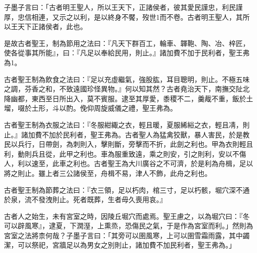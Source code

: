
\begin{pinyinscope}
子墨子言曰：「古者明王聖人，所以王天下，正諸侯者，彼其愛民謹忠，利民謹厚，忠信相連，又示之以利，是以終身不饜，歿世1而不卷。古者明王聖人，其所以王天下正諸侯者，此也。

是故古者聖王，制為節用之法曰：『凡天下群百工，輪車、韗鞄、陶、冶、梓匠，使各從事其所能』，曰：『凡足以奉給民用，則止。』諸加費不加于民利者，聖王弗為1。

古者聖王制為飲食之法曰：『足以充虛繼氣，強股肱，耳目聰明，則止。不極五味之調，芬香之和，不致遠國珍怪異物。』何以知其然？古者堯治天下，南撫交阯北降幽都，東西至日所出入，莫不賓服。逮至其厚愛，黍稷不二，羹胾不重，飯於土塯，啜於土形，斗以酌。俛仰周旋威儀之禮，聖王弗為。

古者聖王制為衣服之法曰：『冬服紺緅之衣，輕且暖，夏服絺綌之衣，輕且凊，則止。』諸加費不加於民利者，聖王弗為。古者聖人為猛禽狡獸，暴人害民，於是教民以兵行，日帶劍，為刺則入，擊則斷，旁擊而不折，此劍之利也。甲為衣則輕且利，動則兵且從，此甲之利也。車為服重致遠，乘之則安，引之則利，安以不傷人，利以速至，此車之利也。古者聖王為大川廣谷之不可濟，於是利為舟楫，足以將之則止。雖上者三公諸侯至，舟楫不易，津人不飾，此舟之利也。

古者聖王制為節葬之法曰：『衣三領，足以朽肉，棺三寸，足以朽骸，堀穴深不通於泉，流不發洩則止。死者既葬，生者毋久喪用哀。』

古者人之始生，未有宮室之時，因陵丘堀穴而處焉。聖王慮之，以為堀穴曰：『冬可以辟風寒』，逮夏，下潤溼，上熏烝，恐傷民之氣，于是作為宮室而利。」然則為宮室之法將柰何哉？子墨子言曰：「其旁可以圉風寒，上可以圉雪霜雨露，其中蠲潔，可以祭祀，宮牆足以為男女之別則止，諸加費不加民利者，聖王弗為。」


\end{pinyinscope}